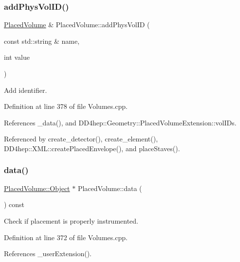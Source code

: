 \subsubsection{\texorpdfstring{add\+Phys\+Vol\+I\+D()}{addPhysVolID()}}
{\footnotesize\ttfamily \hyperlink{class_d_d4hep_1_1_geometry_1_1_placed_volume}{Placed\+Volume} \& Placed\+Volume\+::add\+Phys\+Vol\+ID (\begin{DoxyParamCaption}\item[{const std\+::string \&}]{name,  }\item[{int}]{value }\end{DoxyParamCaption})}



Add identifier. 



Definition at line 378 of file Volumes.\+cpp.



References \+\_\+data(), and D\+D4hep\+::\+Geometry\+::\+Placed\+Volume\+Extension\+::vol\+I\+Ds.



Referenced by create\+\_\+detector(), create\+\_\+element(), D\+D4hep\+::\+X\+M\+L\+::create\+Placed\+Envelope(), and place\+Staves().

\hypertarget{class_d_d4hep_1_1_geometry_1_1_placed_volume_a7288ed4675e755318d1ec6f05fbcf8b9}{}\label{class_d_d4hep_1_1_geometry_1_1_placed_volume_a7288ed4675e755318d1ec6f05fbcf8b9} 
\subsubsection{\texorpdfstring{data()}{data()}}
{\footnotesize\ttfamily \hyperlink{class_d_d4hep_1_1_geometry_1_1_placed_volume_a9ae505098ca6976164b959e1d8b4bbb0}{Placed\+Volume\+::\+Object} $\ast$ Placed\+Volume\+::data (\begin{DoxyParamCaption}{ }\end{DoxyParamCaption}) const}



Check if placement is properly instrumented. 



Definition at line 372 of file Volumes.\+cpp.



References \+\_\+user\+Extension().



